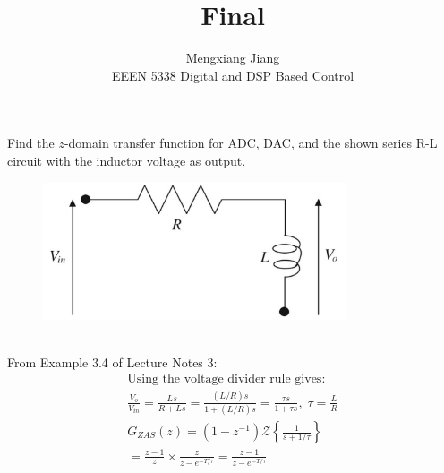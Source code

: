 \documentclass[12pt]{article}
\newenvironment{problem}[2][Problem]{\begin{trivlist}
\item[\hskip \labelsep {\bfseries #1}\hskip \labelsep {\bfseries #2.}]}{\end{trivlist}}
\begin{document}
 
 
\title{Final}%
\author{Mengxiang Jiang\\ %
EEEN 5338 Digital and DSP Based Control} %
 
\maketitle
 
\begin{problem}{1} %
Find the $z$-domain transfer function for ADC, DAC, and the shown series R-L circuit with the inductor voltage as output.\\
\begin{figure}[h]
    \centering
    \includegraphics[width=0.8\textwidth]{p1}
\end{figure}
\\
From Example 3.4 of Lecture Notes 3:
  \begin{align*}
    \text{Using the voltage divider rule gives:}\\
    \frac{V_o}{V_{in}} = \frac{Ls}{R+Ls}=\frac{(L/R)s}{1+(L/R)s}=\frac{\tau s}{1+\tau s},\; \tau=\frac{L}{R}\\
    G_{ZAS}(z) = (1-z^{-1})\mathcal{Z}\left\{\frac{1}{s+1/\tau}\right\}\\
    =\frac{z-1}{z}\times\frac{z}{z-e^{-T/\tau}}=\frac{z-1}{z-e^{-T/\tau}}
  \end{align*}
\end{problem}
\pagebreak
\end{document}
